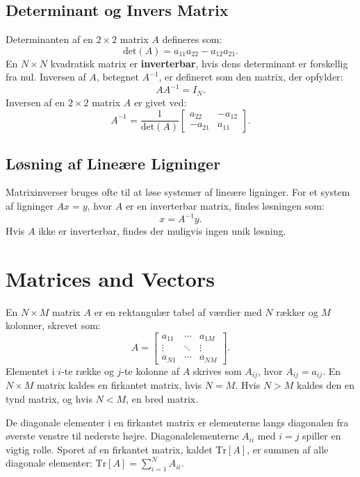 \documentclass[a4paper,12pt]{book}
\begin{document}
	\subsection{Determinant og Invers Matrix}
	Determinanten af en \(2 \times 2\) matrix \(A\) defineres som:
	\[
	\text{det}(A) = a_{11} a_{22} - a_{12} a_{21}.
	\]
	En \(N \times N\) kvadratisk matrix er \textbf{inverterbar}, hvis dens determinant er forskellig fra nul. Inversen af \(A\), betegnet \(A^{-1}\), er defineret som den matrix, der opfylder:
	\[
	A A^{-1} = I_N.
	\]
	Inversen af en \(2 \times 2\) matrix \(A\) er givet ved:
	\[
	A^{-1} = \frac{1}{\text{det}(A)} \begin{bmatrix} 
		a_{22} & -a_{12} \\
		-a_{21} & a_{11} 
	\end{bmatrix}.
	\]
	
	\subsection{Løsning af Lineære Ligninger}
	Matrixinverser bruges ofte til at løse systemer af lineære ligninger. For et system af ligninger \(Ax = y\), hvor \(A\) er en inverterbar matrix, findes løsningen som:
	\[
	x = A^{-1}y.
	\]
	Hvis \(A\) ikke er inverterbar, findes der muligvis ingen unik løsning.
	
	\section{Matrices and Vectors}
	En \(N \times M\) matrix \(A\) er en rektangulær tabel af værdier med \(N\) rækker og \(M\) kolonner, skrevet som:
	\[
	A = \begin{bmatrix}
		a_{11} & \cdots & a_{1M} \\
		\vdots & \ddots & \vdots \\
		a_{N1} & \cdots & a_{NM}
	\end{bmatrix}.
	\]
	Elementet i \(i\)-te række og \(j\)-te kolonne af \(A\) skrives som \(A_{ij}\), hvor \(A_{ij} = a_{ij}\). En \(N \times M\) matrix kaldes en firkantet matrix, hvis \(N = M\). Hvis \(N > M\) kaldes den en tynd matrix, og hvis \(N < M\), en bred matrix.
	
	De diagonale elementer i en firkantet matrix er elementerne langs diagonalen fra øverste venstre til nederste højre. Diagonalelementerne \(A_{ii}\) med \(i = j\) spiller en vigtig rolle. Sporet af en firkantet matrix, kaldet \(\text{Tr}[A]\), er summen af alle diagonale elementer: \(\text{Tr}[A] = \sum_{i=1}^{N} A_{ii}\).
	
\end{document}
